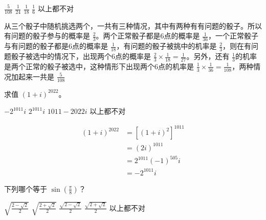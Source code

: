 \documentclass[answers]{exam}
\begin{document}
\begin{questions}
	\begin{oneparchoices}
		\CorrectChoice \( \frac{5}{108} \)
		\choice \( \frac{1}{24} \)
		\choice \( \frac{1}{18} \)
		\choice \( \frac{1}{6} \)
		\choice 以上都不对
	\end{oneparchoices}

	\begin{solution}
		从三个骰子中随机挑选两个，一共有三种情况，其中有两种有有问题的骰子。所以有问题的骰子参与的概率是 \( \frac{2}{3} \)。两个正常骰子都是6点的概率是 \( \frac{1}{36}
		\)，一个正常骰子与有问题的骰子都是6点的概率是 \( \frac{1}{18} \)，有问题的骰子被挑中的机率是 \( \frac{2}{3}
		\)，则在有问题骰子被选中的情况下，出现两个6点的概率是 \( \frac{2}{3} \times \frac{1}{18} = \frac{1}{27} \)。另外，还有 \(
		\frac{1}{3} \)的机率是两个正常的骰子被选中，这种情形下出现两个6点的机率是 \( \frac{1}{3} \times \frac{1}{36} =
		\frac{1}{108} \)，两种情况加起来一共是 \( \frac{5}{108} \)
	\end{solution}

	\question 求值 \( (1+i)^{2022} \)。

	\begin{oneparchoices}
		\choice 1
		\CorrectChoice \( -2^{1011}i \)
		\choice \( 2^{1011}i \)
		\choice \( 1011 - 2022i \)
		\choice 以上都不对
	\end{oneparchoices}

	\begin{solution}
		\begin{align*}
			(1 + i) ^ {2022} & = [(1+i)^2]^{1011}    \\
			                 & = (2i)^{1011}         \\
			                 & = 2^{1011}(-1)^{505}i \\
			                 & = -2^{1011}i
		\end{align*}
	\end{solution}

	\question 下列哪个等于 \(\displaystyle \sin\left(\frac{\pi}{8}\right) \)？

	\begin{oneparchoices}
		\choice \(\displaystyle \sqrt{\frac{2-\sqrt{2}}{2}} \)
		\choice \(\displaystyle \sqrt{\frac{2+\sqrt{2}}{2}} \)
		\CorrectChoice \(\displaystyle \frac{\sqrt{2-\sqrt{2}}}{2} \)
		\choice \(\displaystyle \frac{\sqrt{2+\sqrt{2}}}{2} \)
		\choice 以上都不对
	\end{oneparchoices}


\end{questions}
\end{document}
